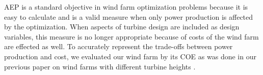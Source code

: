 

AEP is a standard objective in wind farm optimization problems because it is easy to calculate and is a valid measure when only power production is affected by the optimization. When aspects of turbine design are included as design variables, this measure is no longer appropriate because of costs of the wind farm are effected as well. To accurately represent the trade-offs between power production and cost, we evaluated our wind farm by its COE as was done in our previous paper on wind farms with different turbine heights \citep{stanley2018}.



%

              